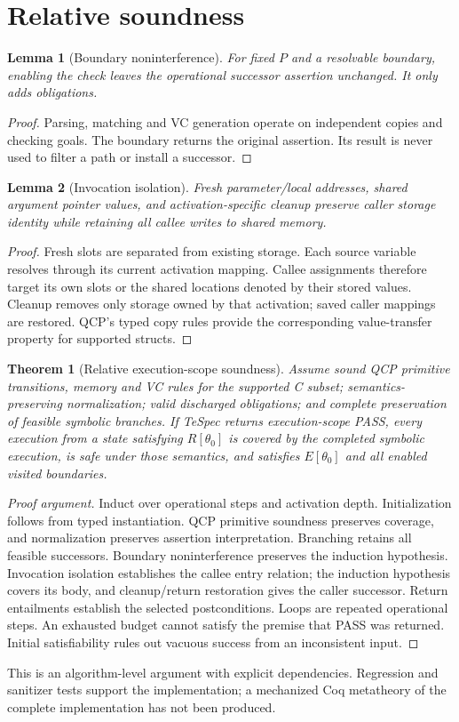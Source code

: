 \documentclass[10pt]{article}
\newtheorem{theorem}{Theorem}
\newtheorem{lemma}{Lemma}
\begin{document}
\section{Relative soundness}
\begin{lemma}[Boundary noninterference]
For fixed $P$ and a resolvable boundary, enabling the check leaves the
operational successor assertion unchanged. It only adds obligations.
\end{lemma}
\begin{proof}
Parsing, matching and VC generation operate on independent copies and checking
goals. The boundary returns the original assertion. Its result is never used
to filter a path or install a successor.
\end{proof}

\begin{lemma}[Invocation isolation]
Fresh parameter/local addresses, shared argument pointer values, and
activation-specific cleanup preserve caller storage identity while retaining
all callee writes to shared memory.
\end{lemma}
\begin{proof}
Fresh slots are separated from existing storage. Each source variable resolves
through its current activation mapping. Callee assignments therefore target
its own slots or the shared locations denoted by their stored values. Cleanup
removes only storage owned by that activation; saved caller mappings are
restored. QCP's typed copy rules provide the corresponding value-transfer
property for supported structs.
\end{proof}

\begin{theorem}[Relative execution-scope soundness]
Assume sound QCP primitive transitions, memory and VC rules for the supported
C subset; semantics-preserving normalization; valid discharged obligations;
and complete preservation of feasible symbolic branches. If TeSpec returns
execution-scope PASS, every execution from a state satisfying $R[\theta_0]$
is covered by the completed symbolic execution, is safe under those semantics,
and satisfies $E[\theta_0]$ and all enabled visited boundaries.
\end{theorem}
\begin{proof}[Proof argument]
Induct over operational steps and activation depth. Initialization follows
from typed instantiation. QCP primitive soundness preserves coverage, and
normalization preserves assertion interpretation. Branching retains all
feasible successors. Boundary noninterference preserves the induction
hypothesis. Invocation isolation establishes the callee entry relation; the
induction hypothesis covers its body, and cleanup/return restoration gives
the caller successor. Return entailments establish the selected postconditions.
Loops are repeated operational steps. An exhausted budget cannot satisfy the
premise that PASS was returned. Initial satisfiability rules out vacuous
success from an inconsistent input.
\end{proof}
This is an algorithm-level argument with explicit dependencies. Regression
and sanitizer tests support the implementation; a mechanized Coq metatheory
of the complete implementation has not been produced.
\end{document}
